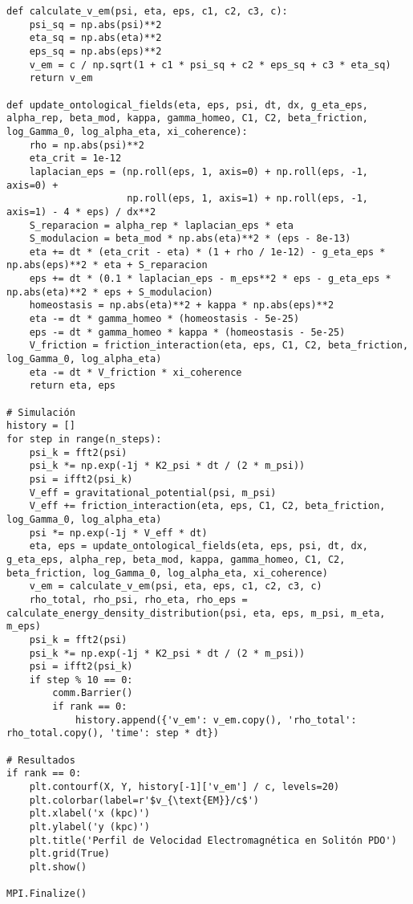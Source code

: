 \documentclass[a4paper,12pt]{article}
\begin{document}
\begin{verbatim}
def calculate_v_em(psi, eta, eps, c1, c2, c3, c):
    psi_sq = np.abs(psi)**2
    eta_sq = np.abs(eta)**2
    eps_sq = np.abs(eps)**2
    v_em = c / np.sqrt(1 + c1 * psi_sq + c2 * eps_sq + c3 * eta_sq)
    return v_em

def update_ontological_fields(eta, eps, psi, dt, dx, g_eta_eps, alpha_rep, beta_mod, kappa, gamma_homeo, C1, C2, beta_friction, log_Gamma_0, log_alpha_eta, xi_coherence):
    rho = np.abs(psi)**2
    eta_crit = 1e-12
    laplacian_eps = (np.roll(eps, 1, axis=0) + np.roll(eps, -1, axis=0) +
                     np.roll(eps, 1, axis=1) + np.roll(eps, -1, axis=1) - 4 * eps) / dx**2
    S_reparacion = alpha_rep * laplacian_eps * eta
    S_modulacion = beta_mod * np.abs(eta)**2 * (eps - 8e-13)
    eta += dt * (eta_crit - eta) * (1 + rho / 1e-12) - g_eta_eps * np.abs(eps)**2 * eta + S_reparacion
    eps += dt * (0.1 * laplacian_eps - m_eps**2 * eps - g_eta_eps * np.abs(eta)**2 * eps + S_modulacion)
    homeostasis = np.abs(eta)**2 + kappa * np.abs(eps)**2
    eta -= dt * gamma_homeo * (homeostasis - 5e-25)
    eps -= dt * gamma_homeo * kappa * (homeostasis - 5e-25)
    V_friction = friction_interaction(eta, eps, C1, C2, beta_friction, log_Gamma_0, log_alpha_eta)
    eta -= dt * V_friction * xi_coherence
    return eta, eps

# Simulación
history = []
for step in range(n_steps):
    psi_k = fft2(psi)
    psi_k *= np.exp(-1j * K2_psi * dt / (2 * m_psi))
    psi = ifft2(psi_k)
    V_eff = gravitational_potential(psi, m_psi)
    V_eff += friction_interaction(eta, eps, C1, C2, beta_friction, log_Gamma_0, log_alpha_eta)
    psi *= np.exp(-1j * V_eff * dt)
    eta, eps = update_ontological_fields(eta, eps, psi, dt, dx, g_eta_eps, alpha_rep, beta_mod, kappa, gamma_homeo, C1, C2, beta_friction, log_Gamma_0, log_alpha_eta, xi_coherence)
    v_em = calculate_v_em(psi, eta, eps, c1, c2, c3, c)
    rho_total, rho_psi, rho_eta, rho_eps = calculate_energy_density_distribution(psi, eta, eps, m_psi, m_eta, m_eps)
    psi_k = fft2(psi)
    psi_k *= np.exp(-1j * K2_psi * dt / (2 * m_psi))
    psi = ifft2(psi_k)
    if step % 10 == 0:
        comm.Barrier()
        if rank == 0:
            history.append({'v_em': v_em.copy(), 'rho_total': rho_total.copy(), 'time': step * dt})

# Resultados
if rank == 0:
    plt.contourf(X, Y, history[-1]['v_em'] / c, levels=20)
    plt.colorbar(label=r'$v_{\text{EM}}/c$')
    plt.xlabel('x (kpc)')
    plt.ylabel('y (kpc)')
    plt.title('Perfil de Velocidad Electromagnética en Solitón PDO')
    plt.grid(True)
    plt.show()

MPI.Finalize()
\end{verbatim}
\end{document}
